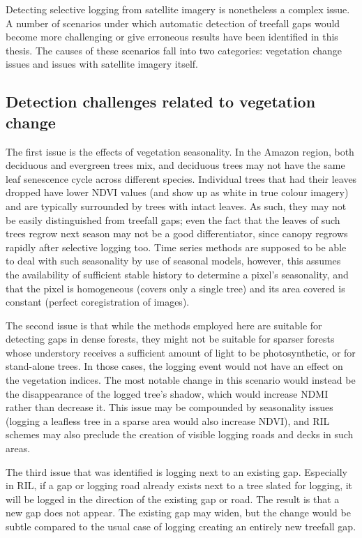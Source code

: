 \documentclass[a4paper,12pt]{scrbook}
\begin{document}
Detecting selective logging from satellite imagery is nonetheless a complex issue. A number of scenarios under which automatic detection of treefall gaps would become more challenging or give erroneous results have been identified in this thesis. The causes of these scenarios fall into two categories: vegetation change issues and issues with satellite imagery itself.

\subsection{Detection challenges related to vegetation change}

The first issue is the effects of vegetation seasonality. In the Amazon region, both deciduous and evergreen trees mix, and deciduous trees may not have the same leaf senescence cycle across different species. Individual trees that had their leaves dropped have lower \ac{NDVI} values (and show up as white in true colour imagery) and are typically surrounded by trees with intact leaves. As such, they may not be easily distinguished from treefall gaps; even the fact that the leaves of such trees regrow next season may not be a good differentiator, since canopy regrows rapidly after selective logging too. Time series methods are supposed to be able to deal with such seasonality by use of seasonal models, however, this assumes the availability of sufficient stable history to determine a pixel's seasonality, and that the pixel is homogeneous (covers only a single tree) and its area covered is constant (perfect coregistration of images).

The second issue is that while the methods employed here are suitable for detecting gaps in dense forests, they might not be suitable for sparser forests whose understory receives a sufficient amount of light to be photosynthetic, or for stand-alone trees. In those cases, the logging event would not have an effect on the vegetation indices. The most notable change in this scenario would instead be the disappearance of the logged tree's shadow, which would increase \ac{NDMI} rather than decrease it. This issue may be compounded by seasonality issues (logging a leafless tree in a sparse area would also increase \ac{NDVI}), and \ac{RIL} schemes may also preclude the creation of visible logging roads and decks in such areas.

The third issue that was identified is logging next to an existing gap. Especially in \ac{RIL}, if a gap or logging road already exists next to a tree slated for logging, it will be logged in the direction of the existing gap or road. The result is that a new gap does not appear. The existing gap may widen, but the change would be subtle compared to the usual case of logging creating an entirely new treefall gap.
\end{document}
